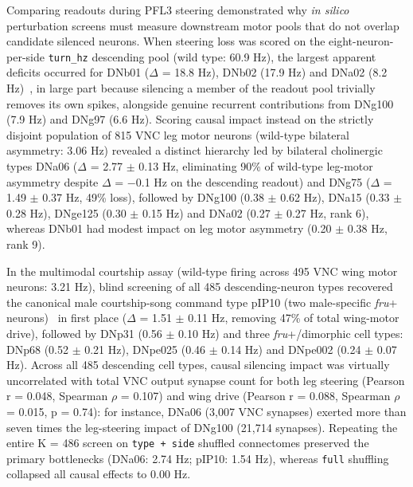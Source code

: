 \documentclass[11pt,a4paper]{article}
\begin{document}
Comparing readouts during PFL3 steering demonstrated why \emph{in silico} perturbation screens must measure downstream motor pools that do not overlap candidate silenced neurons. When steering loss was scored on the eight-neuron-per-side \texttt{turn\_hz} descending pool (wild type: 60.9 Hz), the largest apparent deficits occurred for DNb01 ($\Delta$ = 18.8 Hz), DNb02 (17.9 Hz) and DNa02 (8.2 Hz)~\cite{rayshubskiy2025steering}, in large part because silencing a member of the readout pool trivially removes its own spikes, alongside genuine recurrent contributions from DNg100 (7.9 Hz) and DNg97 (6.6 Hz). Scoring causal impact instead on the strictly disjoint population of 815 VNC leg motor neurons (wild-type bilateral asymmetry: 3.06 Hz) revealed a distinct hierarchy led by bilateral cholinergic types DNa06 ($\Delta$ = 2.77 $\pm$ 0.13 Hz, eliminating 90\% of wild-type leg-motor asymmetry despite $\Delta$ = $-$0.1 Hz on the descending readout) and DNg75 ($\Delta$ = 1.49 $\pm$ 0.37 Hz, 49\% loss), followed by DNg100 (0.38 $\pm$ 0.62 Hz), DNa15 (0.33 $\pm$ 0.28 Hz), DNge125 (0.30 $\pm$ 0.15 Hz) and DNa02 (0.27 $\pm$ 0.27 Hz, rank 6), whereas DNb01 had modest impact on leg motor asymmetry (0.20 $\pm$ 0.38 Hz, rank 9).

In the multimodal courtship assay (wild-type firing across 495 VNC wing motor neurons: 3.21 Hz), blind screening of all 485 descending-neuron types recovered the canonical male courtship-song command type pIP10 (two male-specific \emph{fru}+ neurons)~\cite{vonphilipsborn2011neuronal} in first place ($\Delta$ = 1.51 $\pm$ 0.11 Hz, removing 47\% of total wing-motor drive), followed by DNp31 (0.56 $\pm$ 0.10 Hz) and three \emph{fru}+/dimorphic cell types: DNp68 (0.52 $\pm$ 0.21 Hz), DNpe025 (0.46 $\pm$ 0.14 Hz) and DNpe002 (0.24 $\pm$ 0.07 Hz). Across all 485 descending cell types, causal silencing impact was virtually uncorrelated with total VNC output synapse count for both leg steering (Pearson r = 0.048, Spearman $\rho$ = 0.107) and wing drive (Pearson r = 0.088, Spearman $\rho$ = 0.015, p = 0.74): for instance, DNa06 (3,007 VNC synapses) exerted more than seven times the leg-steering impact of DNg100 (21,714 synapses). Repeating the entire K = 486 screen on \texttt{type + side} shuffled connectomes preserved the primary bottlenecks (DNa06: 2.74 Hz; pIP10: 1.54 Hz), whereas \texttt{full} shuffling collapsed all causal effects to 0.00 Hz.
\end{document}
